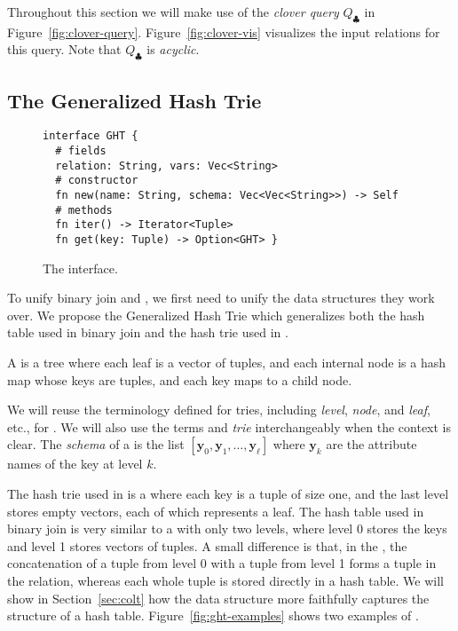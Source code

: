 Throughout this section we will make use of the {\em clover query}
$Q_\clubsuit$ in Figure~\ref{fig:clover-query}.
Figure~\ref{fig:clover-vis} visualizes the input relations for this query.
Note that $Q_\clubsuit$ is
\emph{acyclic}.

\subsection{The Generalized Hash Trie}\label{sec:ght}

\begin{figure}
  \begin{lstlisting}
interface GHT {
  # fields
  relation: String, vars: Vec<String>  
  # constructor
  fn new(name: String, schema: Vec<Vec<String>>) -> Self
  # methods
  fn iter() -> Iterator<Tuple>
  fn get(key: Tuple) -> Option<GHT> }
\end{lstlisting}
  \caption{The \GHT interface.}
  \label{fig:ght}
\end{figure}

To unify binary join and \GJ,
we first need to unify the data structures they work over.
We propose the Generalized Hash Trie
which generalizes both the hash table used in binary join
and the hash trie used in \GJ.

\begin{definition}
  A \GHT is a tree where each leaf is a vector of tuples, and
  each internal node is a hash map whose keys are tuples, and each key
  maps to a child node.
\end{definition}

We will reuse the terminology defined for tries, including
\emph{level}, \emph{node}, and \emph{leaf}, etc., for \GHTs.  We will
also use the terms \GHT and \emph{trie} interchangeably when the
context is clear.  The {\em schema} of a \GHT is the list
$[\bm y_0,\bm y_1, \ldots, \bm y_\ell]$ where $\bm y_k$ are the
attribute names of the key at level $k$.

The hash trie used in \GJ is a \GHT where each key is a tuple of size one,
and the last level stores empty vectors, each of which represents a leaf.
The hash table used in binary join is very similar to a \GHT with only two levels,
where level 0 stores the keys and level 1 stores
vectors of tuples.
A small difference is that, in the \GHT, the concatenation of
a tuple from level 0 with a tuple from level 1 forms a tuple in the relation,
whereas each whole tuple is stored directly in a hash table.
We will show in Section~\ref{sec:colt} how the \COLT data structure
more faithfully captures the structure of a hash table.
Figure~\ref{fig:ght-examples} shows two examples of \GHTs.


